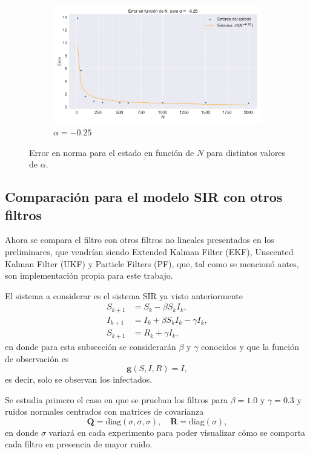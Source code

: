 \begin{figure}[h!]
\begin{subfigure}[b]{0.49\textwidth}
        \includegraphics[width=\linewidth]{img/content/chapter4/linear_error_025.pdf}
    \caption{$\alpha = -0.25$}
    \label{fig:linear_error_025}
    \end{subfigure}    
    \caption{Error en norma para el estado en función de $N$ para distintos valores de $\alpha$.}
\end{figure}

\subsection{Comparación para el modelo SIR con otros filtros}

Ahora se compara el filtro con otros filtros no lineales presentados en los preliminares, que vendrían siendo Extended Kalman Filter (EKF), Unscented Kalman Filter (UKF) y Particle Filters (PF), que, tal como se mencionó antes, son implementación propia para este trabajo. 

El sistema a considerar es el sistema SIR ya visto anteriormente
\begin{equation*}
    \begin{aligned}
    S_{k+1} &= S_k -\beta S_k I_k, \\
    I_{k+1} &= I_k + \beta S_k I_k - \gamma I_k, \\
    S_{k+1} &= R_k + \gamma I_k,
    \end{aligned}
\end{equation*}
en donde para esta subsección se considerarán $\beta$ y $\gamma$ conocidos y que la función de observación es
\begin{equation*}
    \mathbf{g}(S, I, R) = I,
\end{equation*}
es decir, solo se observan los infectados.

Se estudia primero el caso en que se prueban los filtros para $\beta = 1.0$ y $\gamma = 0.3$ y ruidos normales centrados con matrices de covarianza
\begin{equation*}
    \mathbf{Q} = \text{diag}(\sigma, \sigma, \sigma), \quad \mathbf{R} = \text{diag}(\sigma),
\end{equation*}
en donde $\sigma$ variará en cada experimento para poder visualizar cómo se comporta cada filtro en presencia de mayor ruido.


